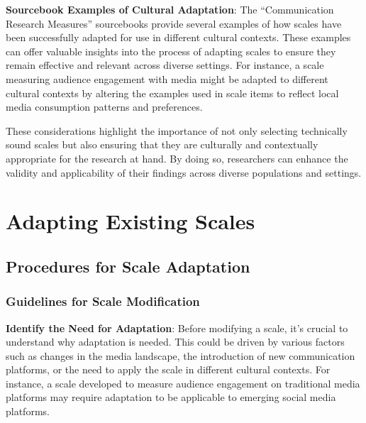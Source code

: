 \documentclass[
]{book}
\begin{document}
\textbf{Sourcebook Examples of Cultural Adaptation}: The ``Communication Research Measures'' sourcebooks provide several examples of how scales have been successfully adapted for use in different cultural contexts. These examples can offer valuable insights into the process of adapting scales to ensure they remain effective and relevant across diverse settings. For instance, a scale measuring audience engagement with media might be adapted to different cultural contexts by altering the examples used in scale items to reflect local media consumption patterns and preferences.

These considerations highlight the importance of not only selecting technically sound scales but also ensuring that they are culturally and contextually appropriate for the research at hand. By doing so, researchers can enhance the validity and applicability of their findings across diverse populations and settings.

\hypertarget{adapting-existing-scales}{%
\section*{Adapting Existing Scales}\label{adapting-existing-scales}}

\hypertarget{procedures-for-scale-adaptation}{%
\subsection*{Procedures for Scale Adaptation}\label{procedures-for-scale-adaptation}}

\hypertarget{guidelines-for-scale-modification}{%
\subsubsection*{Guidelines for Scale Modification}\label{guidelines-for-scale-modification}}

\textbf{Identify the Need for Adaptation}: Before modifying a scale, it's crucial to understand why adaptation is needed. This could be driven by various factors such as changes in the media landscape, the introduction of new communication platforms, or the need to apply the scale in different cultural contexts. For instance, a scale developed to measure audience engagement on traditional media platforms may require adaptation to be applicable to emerging social media platforms.
\end{document}
